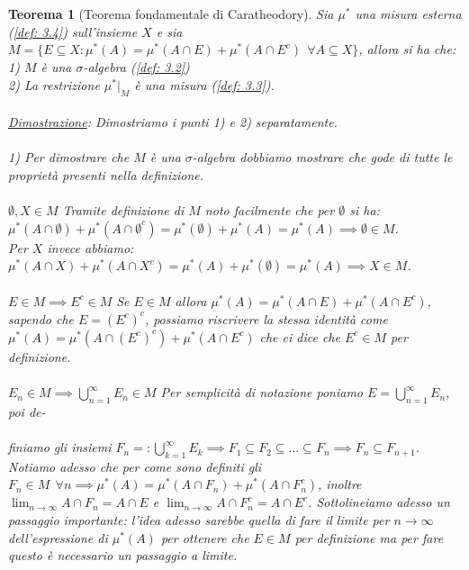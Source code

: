 \documentclass[a4paper,12pt]{report}
\newtheorem{teorema}{Teorema}[chapter]
\begin{document}
\begin{teorema}[Teorema fondamentale di Caratheodory]\label{thm: .2}
    Sia $\mu^*$ una misura esterna (\ref{def: 3.4}) sull'insieme $X$ e sia $M=\{E \subseteq X: \mu^*(A)=\mu^*(A\cap E)+\mu^*(A\cap E^c) \ \ \forall A \subseteq X\}$, allora si ha che:
    \\ 1) $M$ è una $\sigma$-algebra (\ref{def: 3.2}) 
    \\ 2) La restrizione $\mu^*|_M$ è una misura (\ref{def: 3.3}).
    \\
    \\ \underline{Dimostrazione}: Dimostriamo i punti 1) e 2) separatamente.
    \\
    \\ 1) Per dimostrare che $M$ è una $\sigma$-algebra dobbiamo mostrare che gode di tutte le proprietà presenti nella definizione.
    \\
    \\ $\boxed{\emptyset, X \in M}$ Tramite definizione di $M$ noto facilmente che per $\emptyset$ si ha:
    \\$\mu^*(A\cap \emptyset)+\mu^*(A\cap \emptyset^c)=\mu^*(\emptyset)+\mu^*(A)=\mu^*(A)\implies \emptyset \in M$. 
    \\Per $X$ invece abbiamo: $\mu^*(A\cap X)+\mu^*(A\cap X^c)=\mu^*(A)+\mu^*(\emptyset)=\mu^*(A) \implies X\in M$.
    \\
    \\ $\boxed{E \in M\implies E^c\in M}$ Se $E \in M $ allora $\mu^*(A)=\mu^*(A\cap E)+\mu^*(A\cap E^c)$, sapendo che $E=(E^c)^c$, possiamo riscrivere la stessa identità come $\mu^*(A)=\mu^*(A\cap (E^c)^c)+\mu^*(A\cap E^c)$ che ci dice che $E^c \in M$ per definizione.
    \\
    \\ $\boxed{E_n\in M \implies \displaystyle\bigcup_{n=1}^\infty E_n \in M}$ Per semplicità di notazione poniamo $E=\displaystyle\bigcup_{n=1}^\infty E_n$, poi de-
    \\
    \\finiamo gli insiemi $F_n=:\displaystyle\bigcup_{k=1}^\infty E_k \implies F_1 \subseteq F_2\subseteq...\subseteq F_n \implies F_n \subseteq F_{n+1}$. Notiamo adesso che per come sono definiti gli $F_n \in M \ \  \forall n\implies \mu^*(A)=\mu^*(A \cap F_n)+\mu^*(A \cap F_n^c)$, inoltre $\displaystyle\lim_{n\to \infty}A\cap F_n=A \cap E$ e $\displaystyle\lim_{n\to \infty}A \cap F_n^c=A\cap E^c$. Sottolineiamo adesso un passaggio importante: l'idea adesso sarebbe quella di fare il limite per $n \to \infty$ dell'espressione di $\mu^*(A)$ per ottenere che $E\in M$ per definizione ma per fare questo è necessario un passaggio a limite.

\end{teorema}
\end{document}
